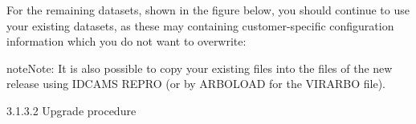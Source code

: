 \documentclass[letterpaper,10pt,english]{sphinxmanual}
\begin{document}

For the remaining datasets, shown in the figure below, you should continue to use your existing datasets, as these may containing customer-specific configuration information which you do not want to overwrite:

\begin{sphinxVerbatim}[commandchars=\\\{\}]
\end{sphinxVerbatim}


\begin{sphinxadmonition}{note}{Note:}
It is also possible to copy your existing files into the files of the new release using IDCAMS REPRO (or by ARBOLOAD for the VIRARBO file).
\end{sphinxadmonition}

3.1.3.2 Upgrade procedure
\end{document}
